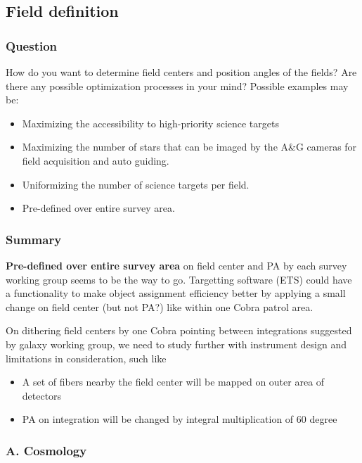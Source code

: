 \documentclass[a4paper,notitlepage]{article}
\begin{document}
\subsection{Field definition}

\subsubsection{Question}
How do you want to determine field centers and position
          angles of the fields? Are there any possible optimization
          processes in your mind? Possible examples may be:
          \begin{itemize}
           \item Maximizing the accessibility to high-priority
             science targets
           \item Maximizing the number of stars that can be imaged
             by the A\&G cameras for field acquisition and auto
             guiding.
           \item Uniformizing the number of science targets per
             field.
           \item Pre-defined over entire survey area. 
          \end{itemize}
          
\subsubsection{Summary}

{\bf Pre-defined over entire survey area} on field center and PA by each survey 
working group seems to be the way to go. 
Targetting software (ETS) could have a functionality to make object assignment 
efficiency better by applying a small change on field center (but not PA?) like 
within one Cobra patrol area. 

On dithering field centers by one Cobra pointing between integrations suggested 
by galaxy working group, we need to study further with instrument design and 
limitations in consideration, such like 
\begin{itemize}
  \item A set of fibers nearby the field center will be mapped on outer area of detectors
  \item PA on integration will be changed by integral multiplication of 60 degree
\end{itemize}

\subsubsection{A. Cosmology}
\end{document}
